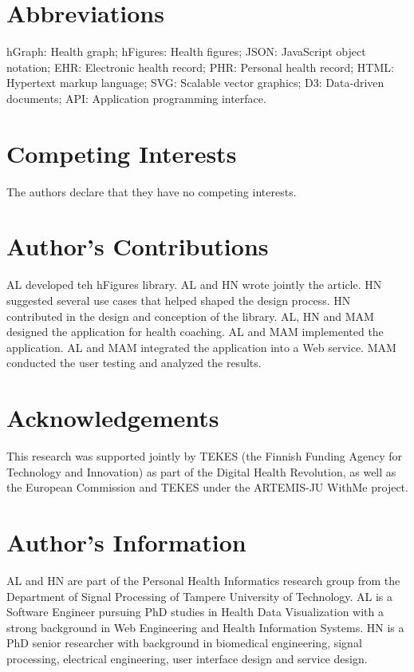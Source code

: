 \documentclass[twocolumn]{bmcart}%
\begin{document}
\begin{backmatter}

\section*{Abbreviations}
    hGraph: Health graph; hFigures: Health figures; JSON: JavaScript object notation; EHR: Electronic health record; PHR: Personal health record; HTML: Hypertext markup language; SVG: Scalable vector graphics; D3: Data-driven documents; API: Application programming interface.

\section*{Competing Interests}
    The authors declare that they have no competing interests.

\section*{Author's Contributions}
AL developed teh hFigures library. AL and HN wrote jointly the article. HN suggested several use cases that helped shaped the design process. HN contributed in the design and conception of the library. AL, HN and MAM designed the application for health coaching. AL and MAM implemented the application. AL and MAM integrated the application into a Web service. MAM conducted the user testing and analyzed the results.
    
\section*{Acknowledgements}
This research was supported jointly by TEKES (the Finnish Funding Agency for Technology and Innovation) as part of the Digital Health Revolution, as well as the European Commission and TEKES under the ARTEMIS-JU WithMe project.
  
\section*{Author's Information}
AL and HN are part of the Personal Health Informatics research group from the Department of Signal Processing of Tampere University of Technology. AL is a Software Engineer pursuing PhD studies in Health Data Visualization with a strong background in Web Engineering and Health Information Systems. HN is a PhD senior researcher with background in biomedical engineering, signal processing, electrical engineering, user interface design and service design.


\end{backmatter}
\end{document}
